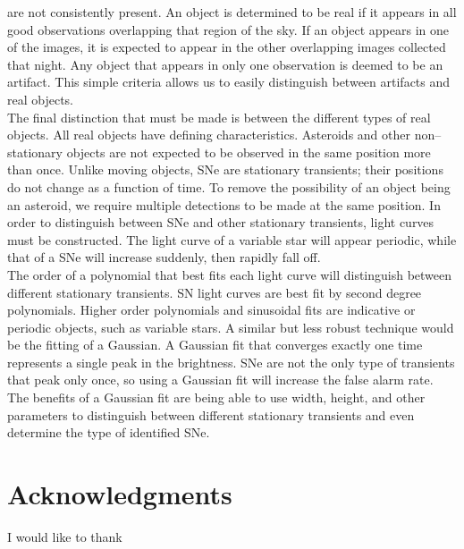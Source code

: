 \documentclass[aps,prb,twocolumn,superscriptaddress]{revtex4-1}
\begin{document}
are not consistently present.   
An object is determined to be real if it appears in all good 
observations overlapping that region of the sky.  
If an object appears in one of the images, it is expected to appear 
in the other overlapping images collected that night.  
Any object that appears in only one observation is deemed to be 
an artifact.  This simple criteria allows us to easily 
distinguish between artifacts and real objects.\\
%
\indent The final distinction that must be made is between the different 
types of real objects.  All real objects have defining characteristics.  
Asteroids and other non--stationary objects are not expected to be observed 
in the same position more than once.  Unlike moving objects, SNe are 
stationary transients; their positions do not change as a function of time.  
To remove the possibility of an object being an asteroid, we require multiple 
detections to be made at the same position.  In order to distinguish between 
SNe and other stationary transients, light curves must be constructed.  The light 
curve of a variable star will appear periodic, while that of a SNe will increase 
suddenly, then rapidly fall off.\\
%
\indent The order of a polynomial that best fits each light curve will distinguish between 
different stationary transients.  SN light curves are best fit by second degree 
polynomials.  
Higher order polynomials and sinusoidal fits are indicative 
or periodic objects, such as variable stars.  
A similar but less robust technique would be the fitting of a Gaussian.  
A Gaussian fit that converges exactly one time represents a single peak in the 
brightness.  SNe are not the only type of transients that peak only once, so using a Gaussian 
fit will increase the false alarm rate.  
The benefits of a Gaussian fit are being able to use width, 
height, and other parameters to distinguish between different 
stationary transients and even determine the type of identified SNe. \\


\section{Acknowledgments}
I would like to thank   %




\setlength{\parindent}{0cm}


\end{document}
